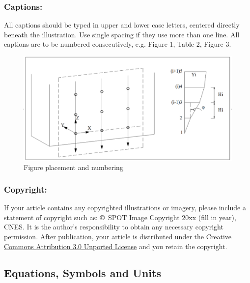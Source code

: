 \documentclass{isprs}
\begin{document}
\subsubsection{Captions:}\label{sec:Captions}

All captions should be typed in upper and lower case letters, 
centered directly beneath the illustration. Use single spacing if they 
use more than one line. All captions are to be numbered consecutively, 
e.g. Figure 1, Table 2, Figure 3.

\begin{figure}[ht!]
\begin{center}
		\includegraphics[width=1.0\columnwidth]{figures/test_sites/fig1.eps}
	\caption{Figure placement and numbering}
\label{fig:figure_placement}
\end{center}
\end{figure}


\subsubsection{Copyright:}\label{sec:Copyright}

If your article contains any copyrighted illustrations or imagery, 
please include a statement of copyright such as: \copyright~SPOT Image Copyright 20xx 
(fill in year), CNES\@. It is the author's responsibility to obtain any necessary 
copyright permission. After publication, your article is distributed under \underline{the Creative 
Commons Attribution 3.0 Unported License} and you retain the copyright.


\subsection{Equations, Symbols and Units}\label{sec:Equations, Symbols and Units}
\end{document}
